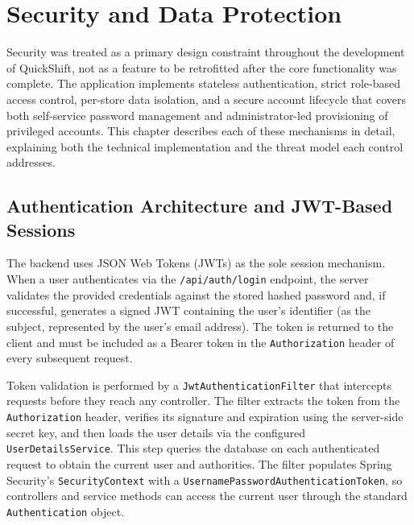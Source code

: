 \chapter{Security and Data Protection}
\label{chap:ch5}

\par Security was treated as a primary design constraint throughout the development of QuickShift, not as a feature to be retrofitted after the core functionality was complete. The application implements stateless authentication, strict role-based access control, per-store data isolation, and a secure account lifecycle that covers both self-service password management and administrator-led provisioning of privileged accounts. This chapter describes each of these mechanisms in detail, explaining both the technical implementation and the threat model each control addresses.

\section{Authentication Architecture and JWT-Based Sessions}
\par The backend uses JSON Web Tokens (JWTs) as the sole session mechanism. When a user authenticates via the \texttt{/api/auth/login} endpoint, the server validates the provided credentials against the stored hashed password and, if successful, generates a signed JWT containing the user's identifier (as the subject, represented by the user's email address). The token is returned to the client and must be included as a Bearer token in the \texttt{Authorization} header of every subsequent request. \cite{JWTDepth}

\par Token validation is performed by a \texttt{JwtAuthenticationFilter} that intercepts requests before they reach any controller. The filter extracts the token from the \texttt{Authorization} header, verifies its signature and expiration using the server-side secret key, and then loads the user details via the configured \texttt{UserDetailsService}. This step queries the database on each authenticated request to obtain the current user and authorities. The filter populates Spring Security's \texttt{SecurityContext} with a \texttt{UsernamePasswordAuthenticationToken}, so controllers and service methods can access the current user through the standard \texttt{Authentication} object.

